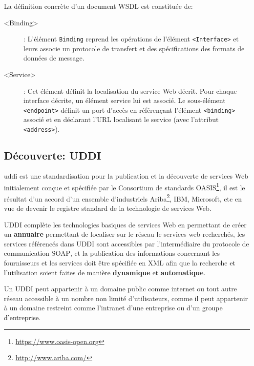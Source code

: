   La définition concrète d'un document \textsc{WSDL} est constituée
  de:

  \SpecialItem
  \renewcommand{\descriptionlabel}[1]{\hspace{1.5cm}\texttt{#1}}
  \begin{description}
  \item[<Binding>]: L'élément \texttt{Binding} reprend les opérations
    de l'élément \texttt{<Interface>} et leurs associe un protocole de
    transfert et des spécifications des formats de données de message.

  \item[<Service>]: Cet élément définit la localisation du service Web
    décrit. Pour chaque interface décrite, un élément service lui est
    associé. Le sous-élément \texttt{<endpoint>} définit un port
    d’accès en référençant l'élément \texttt{<binding>} associé et en
    déclarant l'\textsc{URL} localisant le service (avec l'attribut
    \texttt{<address>}).
  \end{description}

  \subsection{Découverte: UDDI}
  \label{sec:uddi}
  \acrshort{uddi} \cite{clement2004uddi} est une standardisation pour
  la publication et la découverte de services Web initialement conçue
  et spécifiée par le Consortium de standards
  OASIS\footnote{\url{https://www.oasis-open.org}}, il est le résultat
  d'un accord d'un ensemble d'industriels
  Ariba\footnote{\url{http://www.ariba.com/}}, IBM, Microsoft, etc en
  vue de devenir le registre standard de la technologie de services
  Web.

  \textsc{UDDI} complète les technologies basiques de services Web en
  permettant de créer un \textbf{annuaire} permettant de localiser sur
  le réseau le services web recherchés, les services référencés dans
  \textsc{UDDI} sont accessibles par l'intermédiaire du protocole de
  communication \textsc{SOAP}, et la publication des informations
  concernant les fournisseurs et les services doit être spécifiée en
  \textsc{XML} afin que la recherche et l'utilisation soient faites de
  manière \textbf{dynamique} et \textbf{automatique}.

  Un \textsc{UDDI} peut appartenir à un domaine public comme internet
  ou tout autre réseau accessible à un nombre non limité
  d'utilisateurs, comme il peut appartenir à un domaine restreint
  comme l'intranet d'une entreprise ou d'un groupe d'entreprise.

